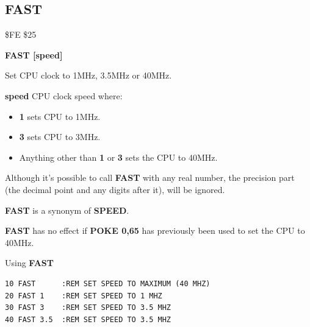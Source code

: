 \subsection{FAST}
\begin{description}[leftmargin=2cm,style=nextline]
\item [Token:] \$FE \$25
\item [Format:] {\bf FAST [speed]}
\item [Usage:] Set CPU clock to 1MHz, 3.5MHz or 40MHz.

                {\bf speed} CPU clock speed where:
                \begin{itemize}
                    \item {\bf 1} sets CPU to 1MHz.
                    \item {\bf 3} sets CPU to 3MHz.
                    \item Anything other than {\bf 1} or {\bf 3} sets the CPU to 40MHz.
                \end{itemize}
\item [Remarks:] Although it's possible to call {\bf FAST}
                 with any real number, the precision part (the decimal point
                 and any digits after it), will be ignored.

                 {\bf FAST} is a synonym of {\bf SPEED}.

                 {\bf FAST} has no effect if {\bf POKE 0,65}
                 has previously been used to set the CPU to 40MHz.

\item [Example:] Using {\bf FAST}
\begin{tcolorbox}[colback=black,coltext=white]
\verbatimfont{\codefont}
\begin{verbatim}
10 FAST      :REM SET SPEED TO MAXIMUM (40 MHZ)
20 FAST 1    :REM SET SPEED TO 1 MHZ
30 FAST 3    :REM SET SPEED TO 3.5 MHZ
40 FAST 3.5  :REM SET SPEED TO 3.5 MHZ
\end{verbatim}
\end{tcolorbox}
\end{description}


\newpage
